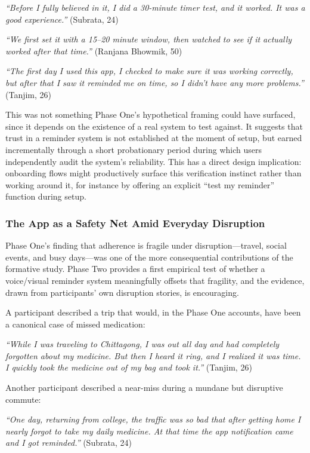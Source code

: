 \documentclass[acmlarge]{acmart}
\begin{document}
\emph{``Before I fully believed in it, I did a 30-minute timer test, and it
worked. It was a good experience.''} (Subrata, 24)

\emph{``We first set it with a 15--20 minute window, then watched to see if
it actually worked after that time.''} (Ranjana Bhowmik, 50)

\emph{``The first day I used this app, I checked to make sure it was
working correctly, but after that I saw it reminded me on time, so I didn't
have any more problems.''} (Tanjim, 26)

This was not something Phase One's hypothetical framing could have
surfaced, since it depends on the existence of a real system to test against.
It suggests that trust in a reminder system is not established at the
moment of setup, but earned incrementally through a short probationary
period during which users independently audit the system's reliability. This
has a direct design implication: onboarding flows might productively surface
this verification instinct rather than working around it, for instance by
offering an explicit ``test my reminder'' function during setup.

\subsubsection{The App as a Safety Net Amid Everyday Disruption}
Phase One's finding that adherence is fragile under disruption---travel,
social events, and busy days---was one of the more consequential contributions
of the formative study. Phase Two provides a first empirical test of whether
a voice/visual reminder system meaningfully offsets that fragility, and the
evidence, drawn from participants' own disruption stories, is encouraging.

A participant described a trip that would, in the Phase One accounts, have
been a canonical case of missed medication:

\emph{``While I was traveling to Chittagong, I was out all day and had
completely forgotten about my medicine. But then I heard it ring, and I
realized it was time. I quickly took the medicine out of my bag and took
it.''} (Tanjim, 26)

Another participant described a near-miss during a mundane but disruptive
commute:

\emph{``One day, returning from college, the traffic was so bad that after
getting home I nearly forgot to take my daily medicine. At that time the
app notification came and I got reminded.''} (Subrata, 24)
\end{document}

